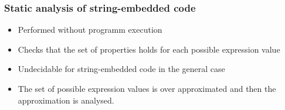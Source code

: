 \documentclass{beamer}
\begin{document}
\begin{frame}
  \transwipe[direction=90]
  \frametitle{Static analysis of string-embedded code}  
  \begin{itemize}
    \item Performed without programm execution
    \item Checks that the set of properties holds for each possible expression value
  \end{itemize}
  
  \begin{itemize}
    \item Undecidable for string-embedded code in the general case
    \item The set of possible expression values is over approximated and then 
the approximation is analysed.
  \end{itemize}
\end{frame}
\end{document}
